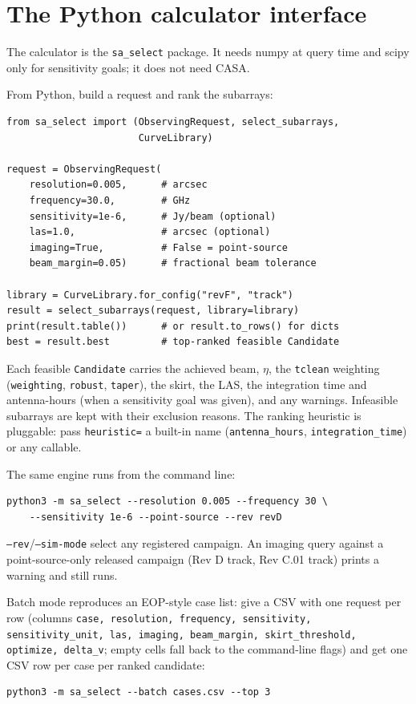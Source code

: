 \documentclass[11pt]{article}
\begin{document}
\section{The Python calculator interface}
\label{sec:pyinterface}

The calculator is the \texttt{sa\_select} package.  It needs numpy at query
time and scipy only for sensitivity goals; it does not need CASA.

From Python, build a request and rank the subarrays:
\begin{verbatim}
from sa_select import (ObservingRequest, select_subarrays,
                       CurveLibrary)

request = ObservingRequest(
    resolution=0.005,      # arcsec
    frequency=30.0,        # GHz
    sensitivity=1e-6,      # Jy/beam (optional)
    las=1.0,               # arcsec (optional)
    imaging=True,          # False = point-source
    beam_margin=0.05)      # fractional beam tolerance

library = CurveLibrary.for_config("revF", "track")
result = select_subarrays(request, library=library)
print(result.table())      # or result.to_rows() for dicts
best = result.best         # top-ranked feasible Candidate
\end{verbatim}
Each feasible \texttt{Candidate} carries the achieved beam, $\eta$, the
\texttt{tclean} weighting (\texttt{weighting}, \texttt{robust},
\texttt{taper}), the skirt, the LAS, the integration time and antenna-hours
(when a sensitivity goal was given), and any warnings.  Infeasible
subarrays are kept with their exclusion reasons.  The ranking heuristic is
pluggable: pass \texttt{heuristic=} a built-in name
(\texttt{antenna\_hours}, \texttt{integration\_time}) or any callable.

The same engine runs from the command line:
\begin{verbatim}
python3 -m sa_select --resolution 0.005 --frequency 30 \
    --sensitivity 1e-6 --point-source --rev revD
\end{verbatim}
\texttt{--rev}/\texttt{--sim-mode} select any registered campaign.  An
imaging query against a point-source-only released campaign (Rev D track,
Rev C.01 track) prints a warning and still runs.

Batch mode reproduces an EOP-style case list: give a CSV with one request
per row (columns \texttt{case, resolution, frequency, sensitivity,
sensitivity\_unit, las, imaging, beam\_margin, skirt\_threshold, optimize,
delta\_v}; empty cells fall back to the command-line flags) and get one CSV
row per case per ranked candidate:
\begin{verbatim}
python3 -m sa_select --batch cases.csv --top 3
\end{verbatim}
\end{document}
